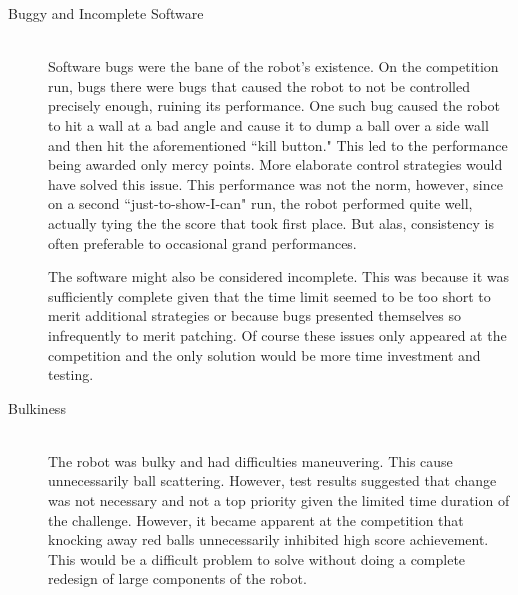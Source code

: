 \documentclass{article}
\begin{document}
\begin{description}
  \item[Buggy and Incomplete Software] \hfill \\
  Software bugs were the bane of the robot's existence. On the competition run, bugs there were bugs that caused the robot to not be controlled precisely enough, ruining its performance. One such bug caused the robot to hit a wall at a bad angle and cause it to dump a ball over a side wall and then hit the aforementioned ``kill button." This led to the performance being awarded only mercy points. More elaborate control strategies would have solved this issue. This performance was not the norm, however, since on a second ``just-to-show-I-can" run, the robot performed quite well, actually tying the the score that took first place. But alas, consistency is often preferable to occasional grand performances.

  The software might also be considered incomplete. This was because it was sufficiently complete given that the time limit seemed to be too short to merit additional strategies or because bugs presented themselves so infrequently to merit patching. Of course these issues only appeared at the competition and the only solution would be more time investment and testing.  


  \item[Bulkiness] \hfill \\
  The robot was bulky and had difficulties maneuvering. This cause unnecessarily ball scattering. However, test results suggested that change was not necessary and not a top priority given the limited time duration of the challenge. However, it became apparent at the competition that knocking away red balls unnecessarily inhibited high score achievement. This would be a difficult problem to solve without doing a complete redesign of large components of the robot. 
\end{description}
\end{document}
